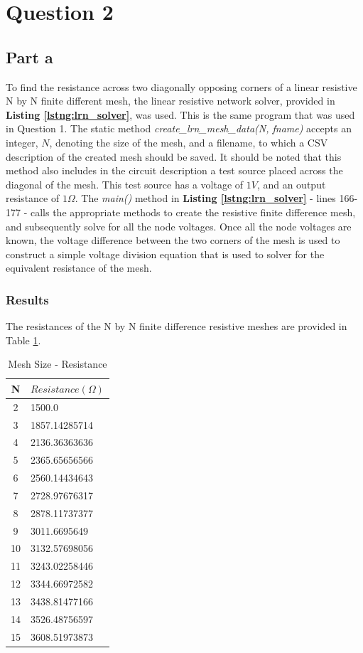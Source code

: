 \documentclass[11pt]{amsart}
\begin{document}
\section*{Question 2}

\subsection*{Part a} To find the resistance across two diagonally opposing corners of a linear resistive N by N finite different mesh, the linear resistive network solver, provided in \textbf{Listing \ref{lstng:lrn_solver}}, was used. This is the same program that was used in Question 1. The static method \textit{create\_lrn\_mesh\_data(N, fname)} accepts an integer, $N$, denoting the size of the mesh, and a filename, to which a CSV description of the created mesh should be saved. It should be noted that this method also includes in the circuit description a test source placed across the diagonal of the mesh. This test source has a voltage of $1V$, and an output resistance of $1 \Omega$. The \textit{main()} method in \textbf{Listing \ref{lstng:lrn_solver}} - lines 166-177 - calls the appropriate methods to create the resistive finite difference mesh, and subsequently solve for all the node voltages. Once all the node voltages are known, the voltage difference between the two corners of the mesh is used to construct a simple voltage division equation that is used to solver for the equivalent resistance of the mesh.

\subsubsection*{Results} The resistances of the N by N finite difference resistive meshes are provided in Table \ref{tbl:r_v_mesh}. 

\begin{table}[h!]
    \caption{Mesh Size - Resistance}
    \label{tbl:r_v_mesh}
    \begin{tabular}{|c|l|}
    	\textbf{N} & \textbf{$Resistance (\Omega)$}\\ \hline
	2 & 1500.0\\
	3 & 1857.14285714\\
        4 & 2136.36363636\\
        5 & 2365.65656566\\
	6 & 2560.14434643\\
	7 & 2728.97676317\\
	8 & 2878.11737377\\
	9 & 3011.6695649\\
	10 & 3132.57698056\\
	11 & 3243.02258446\\
	12 & 3344.66972582\\
	13 & 3438.81477166\\
	14 & 3526.48756597\\
	15 & 3608.51973873
    \end{tabular}
\end{table}
\end{document}

